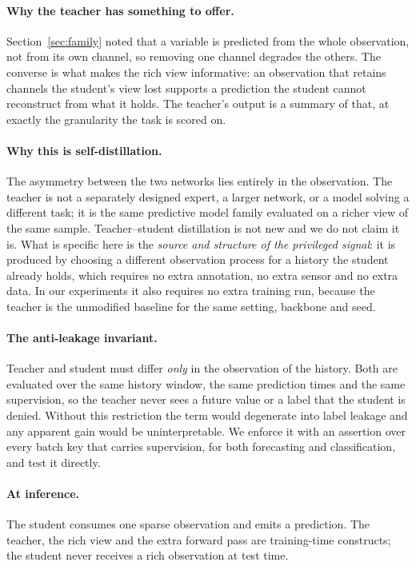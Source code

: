 \paragraph{Why the teacher has something to offer.}
Section~\ref{sec:family} noted that a variable is predicted from the whole observation, not from its own channel,
so removing one channel degrades the others. The converse is what makes the rich view informative: an observation
that retains channels the student's view lost supports a prediction the student cannot reconstruct from what it
holds. The teacher's output is a summary of that, at exactly the granularity the task is scored on.

\paragraph{Why this is self-distillation.}
The asymmetry between the two networks lies entirely in the observation. The teacher is not a separately designed
expert, a larger network, or a model solving a different task; it is the same predictive model family evaluated on
a richer view of the same sample. Teacher--student distillation is not new and we do not claim it is. What is
specific here is the \emph{source and structure of the privileged signal}: it is produced by choosing a different
observation process for a history the student already holds, which requires no extra annotation, no extra sensor
and no extra data. In our experiments it also requires no extra training run, because the teacher is the
unmodified baseline for the same setting, backbone and seed.

\paragraph{The anti-leakage invariant.}
Teacher and student must differ \emph{only} in the observation of the history. Both are evaluated over the same
history window, the same prediction times and the same supervision, so the teacher never sees a future value or a
label that the student is denied. Without this restriction the term would degenerate into label leakage and any
apparent gain would be uninterpretable. We enforce it with an assertion over every batch key that carries
supervision, for both forecasting and classification, and test it directly.

\paragraph{At inference.}
The student consumes one sparse observation and emits a prediction. The teacher, the rich view and the extra
forward pass are training-time constructs; the student never receives a rich observation at test time.

